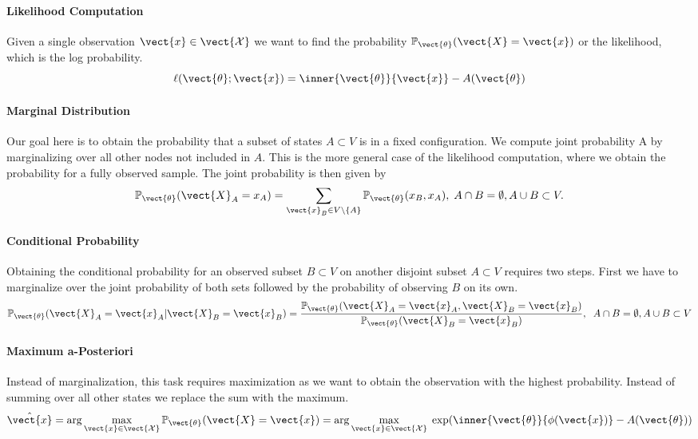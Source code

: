 \paragraph*{Likelihood Computation}
Given a single observation $\vect{x} \in \vect{\mathcal{X}}$ we want to find the probability  $\mathbb{P}_{\vect{\theta}}(\vect{X} = \vect{x})$ or the likelihood, which is the log probability.
\begin{equation}
    \ell(\vect{\theta}; \vect{x}) = \inner{\vect{\theta}}{\vect{x}} - A(\vect{\theta})
\end{equation}

\paragraph*{Marginal Distribution}
Our goal here is to obtain the probability that a subset of states $A \subset V$ is in a fixed configuration.
We compute joint probability \wrt A by marginalizing over all other nodes not included in $A$. 
This is the more general case of the likelihood computation, where we obtain the probability for a fully observed sample.
The joint probability is then given by
    \begin{equation}
        \mathbb{P}_{\vect{\theta}}(\vect{X}_A = x_A) = \sum_{\vect{x}_B \in V \setminus\{A\}} \mathbb{P}_{\vect{\theta}}(x_B , x_A), \; A \cap B = \emptyset, A \cup B \subset V.
    \end{equation}

\paragraph*{Conditional Probability}
Obtaining the conditional probability for an observed subset $B \subset V$ on another disjoint subset $A \subset V$ requires two steps. First we have to marginalize over the joint probability of both sets followed by the probability of observing $B$ on its own.
    \begin{equation}
        \mathbb{P}_{\vect{\theta}}(\vect{X}_A = \vect{x}_A \lvert \vect{X}_B = \vect{x}_B) = \frac{\mathbb{P}_{\vect{\theta}}(\vect{X}_A = \vect{x}_A , \vect{X}_B = \vect{x}_B)}{\mathbb{P}_{\vect{\theta}}(\vect{X}_B = \vect{x}_B)}, \;\; A \cap B = \emptyset, A \cup B \subset V
    \end{equation}

\paragraph*{Maximum a-Posteriori}
Instead of marginalization, this task requires maximization as we want to obtain the observation with the highest probability. 
Instead of summing over all other states we replace the sum with the maximum.
\begin{equation}
    \label{eq:map}
    \hat{\vect{x}} = \arg\max_{\vect{x} \in \vect{\mathcal{X}}} \mathbb{P}_{\vect{\theta}}(\vect{X} = \vect{x}) = \arg\max_{\vect{x} \in \vect{\mathcal{X}}} \; \exp(\inner{\vect{\theta}}{\phi(\vect{x})} - A(\vect{\theta}))
\end{equation}

